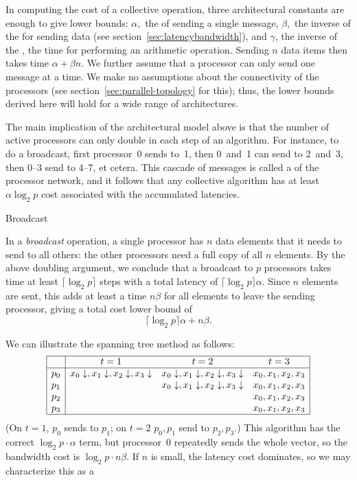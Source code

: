 In computing the cost of a collective operation, three architectural
constants are enough to give lower bounds: $\alpha$,~the  of
sending a single message, $\beta$,~the inverse of the  for
sending data (see section~\ref{sec:latencybandwidth}), and $\gamma$,
the inverse of the , the
time for performing an arithmetic operation. Sending $n$ data
items then takes time $\alpha +\beta n$. We further assume that a
processor can only send one message at a time.
We make no assumptions about the connectivity of the processors
(see section~\ref{sec:parallel-topology} for this);
thus, the lower bounds
derived here will hold for a wide range of architectures.

The main implication of the architectural model above is that the
number of active processors can only double in each step of an
algorithm. For instance, to do a broadcast, first processor~0 sends
to~1, then 0~and~1 can send to 2~and~3, then 0--3 send to 4--7, et
cetera. This cascade of messages is called
a  of the processor network, and
it follows that any collective algorithm has at least $\alpha\log_2p$
cost associated with the accumulated latencies.

 {Broadcast}

In a \emph{broadcast} operation, a single processor has $n$ data elements
that it needs to send to all others: the other processors need a full
copy of all $n$ elements.
By the above doubling argument, we conclude that a broadcast to $p$
processors takes time at least $\lceil\log_2 p\rceil$ steps with a
total latency of $\lceil\log_2 p\rceil \alpha$. Since $n$ elements are
sent, this adds at least a time $n\beta$ for all elements to leave the
sending processor, giving a total cost lower bound of
\[ \lceil\log_2 p\rceil \alpha+n\beta. \]

We can illustrate the spanning tree method as follows:
\[
\begin{array}{|c|ccc|}
\hline
  &t=1&t=2&t=3\\ \hline
p_0&x_0\downarrow,x_1\downarrow,x_2\downarrow,x_3\downarrow
   &x_0\downarrow,x_1\downarrow,x_2\downarrow,x_3\downarrow
   &x_0,x_1,x_2,x_3\\
p_1&&x_0\downarrow,x_1\downarrow,x_2\downarrow,x_3\downarrow
   &x_0,x_1,x_2,x_3\\
p_2&&&x_0,x_1,x_2,x_3\\
p_3&&&x_0,x_1,x_2,x_3\\
\hline
\end{array}
\]
(On $t=1$, $p_0$ sends to $p_1$; on $t=2$ $p_0,p_1$ send to $p_2,p_3$.)
This algorithm has the correct $\log_2p\cdot\alpha$ term, but processor~0 repeatedly
sends the whole vector, so the bandwidth cost is $\log_2p\cdot n\beta$.
If $n$ is small, the latency cost dominates, so we may characterize this 
as a 

